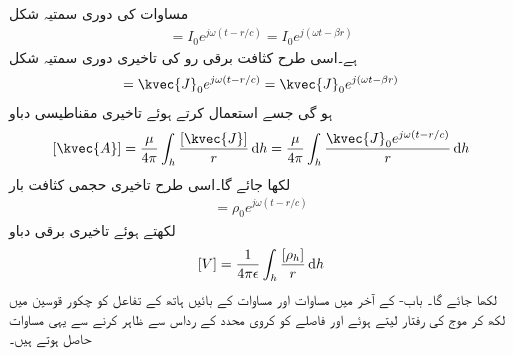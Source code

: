 مساوات  کی دوری سمتیہ شکل
\begin{align}
[I]=I_0 e^{j \omega (t-r/c)}=I_0 e^{j(\omega t-\beta r)}
\end{align}
ہے۔اسی طرح کثافت برقی رو کی تاخیری دوری سمتیہ شکل
\begin{align}
[\kvec{J}]=\kvec{J}_0 e^{j \omega (t-r/c)}=\kvec{J}_0 e^{j(\omega  t -\beta r)}
\end{align}
ہو گی جسے استعمال کرتے ہوئے تاخیری مقناطیسی دباو
\begin{align}\label{مساوات_اینٹینا_تاخیری_سمتی_دباو}
[\kvec{A}]=\frac{\mu}{4\pi}\int_h \frac{[\kvec{J}]}{r}\dif h=\frac{\mu}{4\pi}\int_h \frac{\kvec{J}_0 e^{j\omega(t-r/c)}}{r} \dif h
\end{align}
لکھا جائے گا۔اسی طرح تاخیری حجمی کثافت بار
\begin{align}
[\rho_h]= \rho_0 e^{j\omega \left(t-r/c \right)}
\end{align}
لکھتے ہوئے تاخیری برقی دباو
\begin{align}\label{مساوات_اینٹینا_تاخیری_غیر_سمتی_دباو}
[V]=\frac{1}{4\pi \epsilon}\int_h \frac{[\rho_h]}{ r} \dif h
\end{align}
لکھا جائے گا۔ باب- کے آخر میں مساوات  اور مساوات  کے بائیں ہاتھ کے تفاعل کو چکور قوسین میں لکھ کر موج کی رفتار  لیتے ہوئے اور فاصلے  کو کروی محدد کے رداس  سے ظاہر کرنے سے  یہی مساوات حاصل ہوتے ہیں۔

